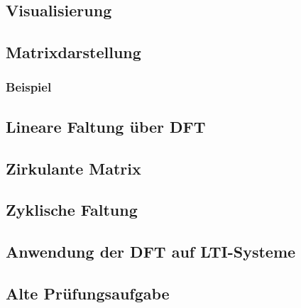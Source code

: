 \documentclass[11pt]{article}
\begin{document}
\subsection*{Visualisierung}
\vspace*{-0.5cm}

\subsection*{Matrixdarstellung}
\vspace*{-0.5cm}

\subsubsection*{Beispiel}
\vspace*{-0.5cm}

\subsection*{Lineare Faltung über DFT}
\vspace*{-0.5cm}

\subsection*{Zirkulante Matrix}
\vspace*{-0.5cm}

\subsection*{Zyklische Faltung}
\vspace*{-0.5cm}

\subsection*{Anwendung der DFT auf LTI-Systeme}
\vspace*{-0.5cm}

\subsection*{Alte Prüfungsaufgabe}
\vspace*{-0.5cm}
\end{document}
